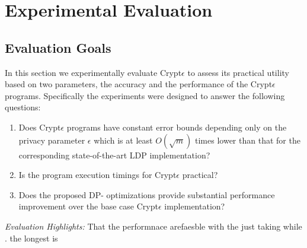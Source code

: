 \section{Experimental Evaluation}
\subsection{Evaluation Goals}
In this section we experimentally evaluate  Crypt$\epsilon$ to assess its practical utility  based on two parameters, the accuracy and the performance of the Crypt$\epsilon$ programs. Specifically the experiments were designed to answer the following questions:
\begin{enumerate}\item Does Crypt$\epsilon$ programs have constant error bounds depending only on the privacy parameter $\epsilon$  which is at least $O(\sqrt{m})$ times lower than that for the corresponding state-of-the-art LDP implementation? \item Is the program execution timings for Crypt$\epsilon$ practical? \item Does the proposed DP- optimizations provide substantial performance improvement over the base case Crypt$\epsilon$ implementation? \end{enumerate}
\textit{Evaluation Highlights:}
That the performnace arefaesble with the just taking while . the longest is 
